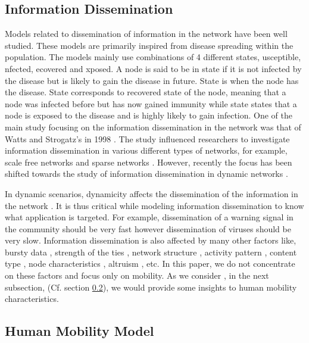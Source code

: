 \documentclass[preprint, twocolumn,5p]{elsarticle}
\begin{document}
    \subsection{Information Dissemination}\label{subsec:spreading}
    Models related to dissemination of information in the network have been well studied. These models are primarily inspired from disease spreading within the population. The models mainly use combinations of 4 different states, usceptible, nfected, ecovered and xposed. A node is said to be in state  if it is not infected by the disease but is likely to gain the disease in future. State  is when the node has the disease. State  corresponds to recovered state of the node, meaning that a node was infected before but has now gained immunity while  state states that a node is exposed to the disease and is highly likely to gain infection. One of the main study focusing on the information dissemination in the network was that of Watts and Strogatz's in 1998 \cite{Watts1998}. The study influenced researchers to investigate information dissemination in various different types of networks, for example, scale free networks \cite{PastorSatorras2001,Santos2005} and sparse networks \cite{Pettarin2011}. However, recently the focus has been shifted towards the study of information dissemination in dynamic networks \cite{Kivela2012,Clementi2008,Prakash2010,Schwarzkopf2010,Valler2011,Dutta2011,Clementi2011,Clementi2012}.

    In dynamic scenarios, dynamicity affects the dissemination of the information in the network \cite{Kivela2012}. It is thus critical while modeling information dissemination to know what application is targeted. For example, dissemination of a warning signal in the community should be very fast however dissemination of viruses should be very slow. Information dissemination is also affected by many other factors like, bursty data \cite{Karsai2011}, strength of the ties \cite{Miritello2011}, network structure \cite{Nicosia2011}, activity pattern \cite{Vazquez2007}, content type \cite{Wang2009}, node characteristics \cite{Wang2011a}, altruism \cite{Hui2009}, etc. In this paper, we do not concentrate on these factors and focus only on mobility. As we consider , in the next subsection, (Cf. section \ref{subsec:mobility}), we would provide some insights to human mobility characteristics.

    \subsection{Human Mobility Model}\label{subsec:mobility}
\end{document}
